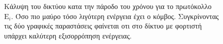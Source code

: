\begin{figure}[H]
  \centering
  \caption{Κάλυψη του δικτύου κατα την πάροδο του χρόνου για το πρωτόκολλο $\text{E}_{i}$. Όσο πιο μαύρο τόσο λιγότερη ενέργεια έχει ο κόμβος. Συγκρίνοντας τις δύο
γραφικές παραστάσεις φαίνεται οτι στο δίκτυο με φορτιστή υπάρχει καλύτερη εξισορρόπηση ενέργειας.}
  \label{fig:5_1exp_4_3}
\end{figure}



